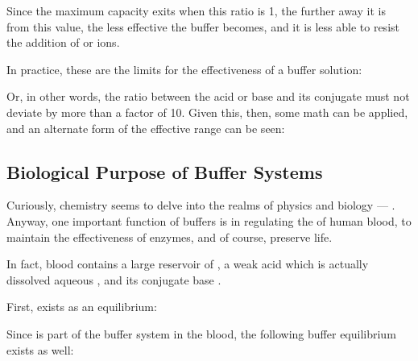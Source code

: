 			Since the maximum capacity exits when this ratio is 1, the further away it is from this value, the less effective the buffer becomes,
			and it is less able to resist the addition of  or  ions.

			In practice, these are the limits for the effectiveness of a buffer solution:


			Or, in other words, the ratio between the acid or base and its conjugate must not deviate by more than a factor of \num{10}. Given
			this, then, some math can be applied, and an alternate form of the effective range can be seen:




		\pagebreak
		\subsection{Biological Purpose of Buffer Systems}

			Curiously, chemistry seems to delve into the realms of physics and biology --- . Anyway,
			one important function of buffers is in regulating the \pH{} of human blood, to maintain the effectiveness of enzymes, and of course,
			preserve life.

			In fact, blood contains a large reservoir of , a weak acid which is actually dissolved aqueous , and its
			conjugate base .

			First,  exists as an equilibrium:


			Since  is part of the buffer system in the blood, the following buffer equilibrium exists as well:



